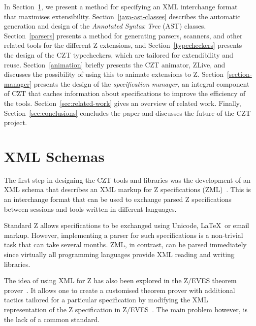 \documentclass{llncs}
\begin{document}
  In Section~\ref{xml-schemas}, we present a method for specifying an
  XML interchange format that maximises extensibility.
  Section~\ref{java-ast-classes} describes the automatic generation
  and design of the \emph{Annotated Syntax Tree} (AST) classes.
  Section~\ref{parsers} presents a method for generating parsers,
  scanners, and other related tools for the different Z extensions,
  and Section~\ref{typecheckers} presents the design of the CZT
  typecheckers, which are tailored for extendibility and
  reuse. Section~\ref{animation} briefly presents the CZT animator,
  ZLive, and discusses the possibility of using this to animate
  extensions to Z. Section~\ref{section-manager} presents the design
  of the {\em specification manager}, an integral component of CZT
  that caches information about specifications to improve the
  efficiency of the tools.  Section~\ref{sec:related-work} gives an
  overview of related work.  Finally, Section~\ref{sec:conclusions}
  concludes the paper and discusses the future of the CZT project.


\section{XML Schemas}
\label{xml-schemas}

  The first step in designing the CZT tools and libraries was the
  development of an XML schema that describes an XML markup for Z
  specifications (ZML)~\cite{UttEA:03}.  This is an interchange format
  that can be used to exchange parsed Z specifications between
  sessions and tools written in different languages.

  Standard Z allows specifications to be exchanged using Unicode,
  \LaTeX\ or email markup.  However, implementing a parser for such
  specifications is a non-trivial task that can take several months.
  ZML, in contrast, can be parsed immediately since virtually all
  programming languages provide XML reading and writing libraries.

  The idea of using XML for Z has also been explored in the
  Z/EVES theorem prover~\cite{tp.tools:zeves.ref}.  It allows one to
  create a customised theorem prover with additional tactics tailored
  for a particular specification by modifying the XML representation
  of the Z specification in Z/EVES~\cite{tp.tools:zeves.api}.
  The main problem however, is the lack of a common standard.
\end{document}
